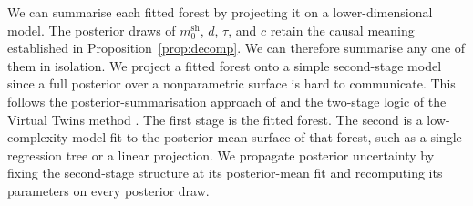 We can summarise each fitted forest by projecting it on a lower-dimensional model.
The posterior draws of $m_0^{\mathrm{sh}}$, $d$, $\tau$, and $c$ retain the causal meaning established in Proposition~\ref{prop:decomp}.
We can therefore summarise any one of them in isolation.
We project a fitted forest onto a simple second-stage model since a full posterior over a nonparametric surface is hard to communicate.
This follows the posterior-summarisation approach of \citet{Woody2020} and the two-stage logic of the Virtual Twins method \citep{foster2011subgroup}.
The first stage is the fitted forest.
The second is a low-complexity model fit to the posterior-mean surface of that forest, such as a single regression tree or a linear projection.
We propagate posterior uncertainty by fixing the second-stage structure at its posterior-mean fit and recomputing its parameters on every posterior draw.





